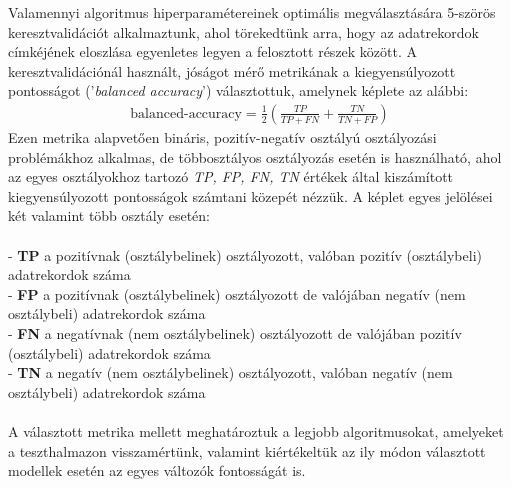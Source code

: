 \documentclass[12pt]{article}
\begin{document}
Valamennyi algoritmus hiperparamétereinek optimális megválasztására 5-szörös keresztvalidációt alkalmaztunk, ahol törekedtünk arra, hogy az adatrekordok címkéjének eloszlása egyenletes legyen a felosztott részek között. A keresztvalidációnál használt, jóságot mérő metrikának a kiegyensúlyozott pontosságot ('\textit{balanced accuracy}') választottuk, amelynek képlete az alábbi:
\begin{align*}
\text{balanced-accuracy} = \frac{1}{2}\left(\frac{TP}{TP+FN} + \frac{TN}{TN+FP} \right) 
\end{align*}Ezen metrika alapvetően bináris, pozitív-negatív osztályú osztályozási problémákhoz alkalmas, de többosztályos osztályozás esetén is használható, ahol az egyes osztályokhoz tartozó \textit{TP, FP, FN, TN} értékek által kiszámított kiegyensúlyozott pontosságok számtani közepét nézzük. A képlet egyes jelölései két valamint több osztály esetén:  \\ \\
- \textbf{TP} a pozitívnak (osztálybelinek) osztályozott, valóban pozitív (osztálybeli) adatrekordok száma \\
- \textbf{FP} a pozitívnak (osztálybelinek) osztályozott de valójában negatív (nem osztálybeli) adatrekordok száma \\
- \textbf{FN} a negatívnak (nem osztálybelinek) osztályozott de valójában pozitív (osztálybeli) adatrekordok száma \\
- \textbf{TN} a negatív (nem osztálybelinek) osztályozott, valóban negatív (nem osztálybeli) adatrekordok száma \\ 
\\
A választott metrika mellett meghatároztuk a legjobb algoritmusokat, amelyeket a teszthalmazon visszamértünk, valamint kiértékeltük az ily módon választott modellek esetén az egyes változók fontosságát is.
\end{document}
